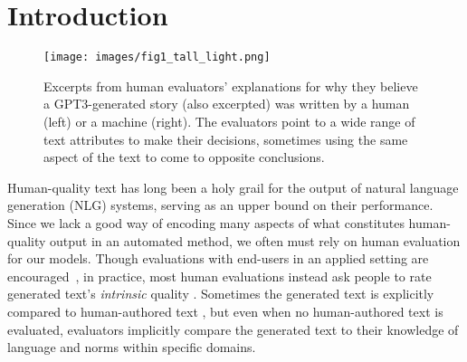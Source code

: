 \section{Introduction}
\begin{figure}[ht]
\centering
\texttt{[image: images/fig1\_tall\_light.png]} %
\caption{Excerpts from human evaluators' explanations for why they believe a GPT3-generated story (also excerpted) was written by a human (left) or a machine (right). The evaluators point to a wide range of text attributes to make their decisions, sometimes using the same aspect of the text to come to opposite conclusions.}
\label{fig:intro_fig}
\end{figure}

Human-quality text has long been a holy grail for the output of natural language generation (NLG) systems, serving as an upper bound on their performance. %
Since we lack a good way of encoding many aspects of what constitutes human-quality output in an automated method, we often must rely on human evaluation for our models.
Though evaluations with end-users in an applied setting are encouraged~\cite{belz-reiter-2006-comparing}, in practice, most human evaluations instead ask people to rate generated text's \emph{intrinsic} quality
\citep{van-der-lee-etal-2019-best, howcroft-etal-2020-twenty}.
Sometimes the generated text is explicitly compared to human-authored text \citep[e.g.,][]{liu-etal-2016-evaluate,zellers_turingadvice, Zhang2020PEGASUSPW}, but even when no human-authored text is evaluated, evaluators implicitly compare the generated text to their knowledge of language and norms within specific domains. %


